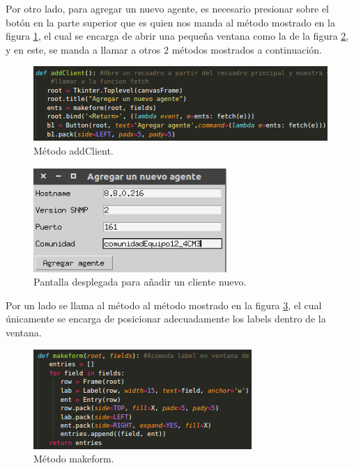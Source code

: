 Por otro lado, para agregar un nuevo agente, es necesario presionar sobre el botón en la parte superior que es quien nos manda al método mostrado en la figura \ref{image:add1}, el cual se encarga de abrir una pequeña ventana como la de la figura \ref{image:addP}, y en este, se manda a llamar a otros 2 métodos mostrados a continuación.
\FloatBarrier
\begin{figure}[htbp!]
		\centering
	\includegraphics[width=.8 \textwidth]{images/add1}
		\caption{Método addClient.}		\label{image:add1}
\end{figure}
\FloatBarrier

\FloatBarrier
\begin{figure}[htbp!]
		\centering
	\includegraphics[width=.4 \textwidth]{images/addP}
		\caption{Pantalla desplegada para añadir un cliente nuevo.}		\label{image:addP}
\end{figure}
\FloatBarrier

Por un lado se llama al método al método mostrado en la figura \ref{image:add2}, el cual únicamente se encarga de posicionar adecuadamente los labels dentro de la ventana.
\FloatBarrier
\begin{figure}[htbp!]
		\centering
	\includegraphics[width=.5 \textwidth]{images/add2}
		\caption{Método makeform.}		\label{image:add2}
\end{figure}
\FloatBarrier


